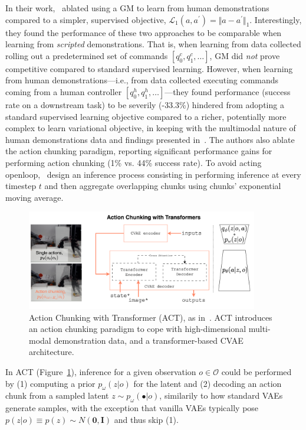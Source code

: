 In their work,~\citet{zhaoLearningFineGrainedBimanual2023} ablated using a GM to learn from human demonstrations compared to a simpler, supervised objective, \( \mathcal L_1(a,a^\prime) = \Vert a - a^\prime \Vert_1 \).
Interestingly, they found the performance of these two approaches to be comparable when learning from \emph{scripted} demonstrations.
That is, when learning from data collected rolling out a predetermined set of commands \( [q^c_0, q^c_1, \dots] \), GM did \emph{not} prove competitive compared to standard supervised learning.
However, when learning from human demonstrations---i.e., from data collected executing commands coming from a human controller \( [q^h_0, q^h_1, \dots] \)---they found performance (success rate on a downstream task) to be severily (-33.3\%) hindered from adopting a standard supervised learning objective compared to a richer, potentially more complex to learn variational objective, in keeping with the multimodal nature of human demonstrations data and findings presented in~\citet{florenceImplicitBehavioralCloning2022}.
The authors also ablate the action chunking paradigm, reporting significant performance gains for performing action chunking (1\% vs. 44\% success rate).
To avoid acting openloop,~\citet{zhaoLearningFineGrainedBimanual2023} design an inference process consisting in performing inference at every timestep \( t \) and then aggregate overlapping chunks using chunks' exponential moving average.

\begin{figure}
    \centering
    \includegraphics[width=0.9\textwidth]{figures/ch4/ch4-act.png}
    \caption{Action Chunking with Transformer (ACT), as in~\citet{zhaoLearningFineGrainedBimanual2023}. ACT introduces an action chunking paradigm to cope with high-dimensional multi-modal demonstration data, and a transformer-based CVAE architecture.}
    \label{fig:ch4-act}
\end{figure}

In ACT (Figure~\ref{fig:ch4-act}), inference for a given observation \( o \in \mathcal O \) could be performed by (1) computing a prior \( p_\omega(z \vert o) \) for the latent and (2) decoding an action chunk from a sampled latent \( z \sim p_\omega(\bullet \vert o) \), similarily to how standard VAEs generate samples, with the exception that vanilla VAEs typically pose \( p(z\vert o) \equiv p(z) \sim N(\mathbf{0}, \mathbf{I}) \) and thus skip (1).

